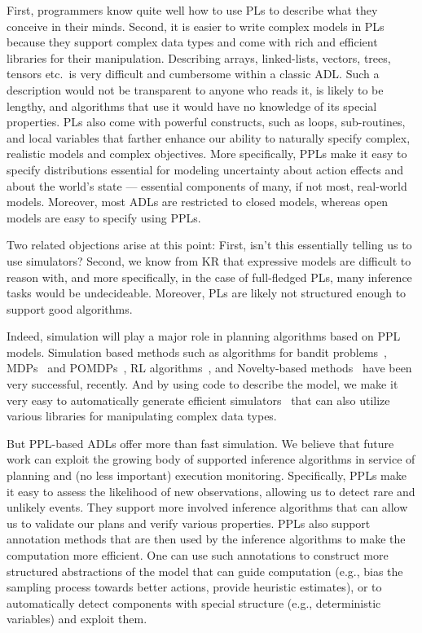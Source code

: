 \documentclass[letterpaper]{article} %
\theoremstyle{definition}
\begin{document}
First, programmers know quite well how to use PLs to describe what they conceive in their minds. Second, it is  easier to write complex models in PLs because
they support complex data types and come with rich and efficient libraries for their manipulation. Describing arrays, linked-lists, vectors, trees, tensors etc.~is very difficult and cumbersome within a classic ADL. Such a description would not be transparent to anyone who reads it, is likely to be lengthy, and algorithms that use it would have no knowledge of its special properties. PLs also come with powerful constructs, such as loops, sub-routines, and local variables
that farther enhance our ability to naturally specify complex, realistic models and complex objectives.
More specifically, PPLs make it easy to specify distributions essential for modeling uncertainty about action effects and about the world's state --- essential components of many, if not most, real-world models. Moreover, most ADLs are restricted to closed models, whereas open models are easy to specify using PPLs.

Two related objections arise at this point: First, isn't this essentially telling us to use simulators? Second, we know from KR that expressive models are difficult to reason with, and more specifically,
in the case of full-fledged PLs, many inference tasks would be undecideable. Moreover, PLs are likely not structured enough to support good algorithms.

Indeed, simulation will play
a major role in planning algorithms based on PPL models. Simulation based methods such as algorithms for bandit problems~\cite{UCB},
MDPs~\cite{Puterman} and POMDPs~\cite{SV10,Despot}, RL algorithms~\cite{RLBook}, and Novelty-based methods~\cite{Novelty} have been very successful, recently.
And by using code to describe the model, we make it very easy to automatically generate efficient simulators~\cite{AOS-WS22} that can also
utilize various libraries for manipulating complex data types.

But PPL-based ADLs offer more than fast simulation.
We believe that future work can
exploit the growing body of supported inference algorithms  in service of planning and (no less important) execution monitoring. Specifically, PPLs make it easy to assess the
likelihood of new observations, allowing us to detect rare and unlikely events. They support more involved inference algorithms that can allow us to validate our plans and verify various properties.
PPLs also support annotation methods that are then used by the inference algorithms to make the computation more efficient.
One can use such annotations to construct more structured abstractions of the model that can guide computation (e.g., bias the sampling process towards better actions,
provide heuristic estimates), or to automatically detect components with special structure (e.g., deterministic variables) and exploit them.
\end{document}
